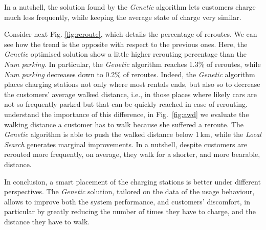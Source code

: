 \documentclass[review, letterpaper,3p, 11pt]{elsarticle}
\newcommand{\lv}[1]{{\color{cyan}{[luca: #1]}}}
\providecommand{\DIFaddtex}[1]{{\protect\color{blue}\uwave{#1}}} %
\providecommand{\DIFaddbegin}{} %
\providecommand{\DIFaddend}{} %
\providecommand{\DIFdelbegin}{} %
\providecommand{\DIFdelend}{} %
\providecommand{\DIFadd}[1]{\texorpdfstring{\DIFaddtex{#1}}{#1}} %
\providecommand{\DIFdel}[1]{} %
\begin{document}
In a nutshell, the solution found by the \textit{Genetic} algorithm lets customers charge much less frequently, while keeping the average state of charge very similar. 

Consider next Fig. \ref{fig:reroute}, which details the percentage of reroutes. We can see how the trend is the opposite with respect to the previous ones. Here, the \textit{Genetic} optimised solution show a little higher rerouting percentage than the \textit{Num parking}. 
In particular, the \textit{Genetic} algorithm 
reaches 1.3\% of reroutes, while \textit{Num parking} decreases down to 0.2\% of reroutes. Indeed, the \textit{Genetic} algorithm places charging stations not only where most rentals ends, but also so to decrease the customers' average walked distance, i.e., in those places where likely cars are not so frequently parked but that can be quickly reached in case of rerouting.
\DIFdelbegin \DIFdel{In order to }\DIFdelend \DIFaddbegin \DIFadd{To }\DIFaddend understand the importance of this difference, in Fig.~\ref{fig:awd} we evaluate the walking distance a customer has to walk because she suffered a reroute.  
The \textit{Genetic} algorithm is able to push the walked distance below 1\,km, while the \textit{Local Search} generates marginal improvements.
In a nutshell, despite customers are rerouted more frequently, on average, they walk for a shorter, and  more bearable, distance.


In conclusion, a smart placement of the charging stations is better under different perspectives.  The \textit{Genetic} solution, tailored on the data of the usage behaviour, allows \DIFaddbegin \DIFadd{us }\DIFaddend to improve both the system performance, and customers' discomfort, in particular by greatly reducing the number of times they have to charge, and the distance they have to walk.
\end{document}
